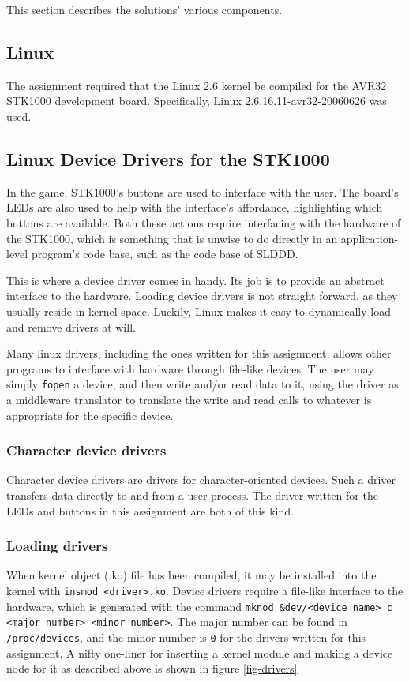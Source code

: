 This section describes the solutions' various components.

\subsection{Linux}
The assignment required that the Linux 2.6 kernel be compiled for the AVR32 STK1000 development board.
Specifically, Linux 2.6.16.11-avr32-20060626 was used.

\subsection{Linux Device Drivers for the STK1000}
In the game, STK1000's buttons are used to interface with the user.
The board's LEDs are also used to help with the interface's affordance, highlighting which buttons are available.
Both these actions require interfacing with the hardware of the STK1000, which is something that is unwise to do directly in an application-level program's code base, such as the code base of SLDDD.

This is where a device driver comes in handy. Its job is to provide an abstract interface to the hardware.
Loading device drivers is not straight forward, as they usually reside in kernel space.
Luckily, Linux makes it easy to dynamically load and remove drivers at will.

Many linux drivers, including the ones written for this assignment, allows other programs to interface with hardware through file-like devices.
The user may simply \texttt{fopen} a device, and then write and/or read data to it, using the driver as a middleware translator to translate the write and read calls to whatever is appropriate for the specific device.
\subsubsection{Character device drivers}
    Character device drivers are drivers for character-oriented devices.
    Such a driver transfers data directly to and from a user process.
    The driver written for the LEDs and buttons in this assignment are both of this kind.
\subsubsection{Loading drivers}
When kernel object (.ko) file has been compiled, it may be installed into the kernel with \texttt{insmod <driver>.ko}.
Device drivers require a file-like interface to the hardware, which is generated with the command \texttt{mknod \&dev/<device name> c <major number> <minor number>}.
The major number can be found in \texttt{/proc/devices}, and the minor number is \texttt{0} for the drivers written for this assignment.
A nifty one-liner for inserting a kernel module and making a device node for it as described above is shown in figure \ref{fig-drivers}

